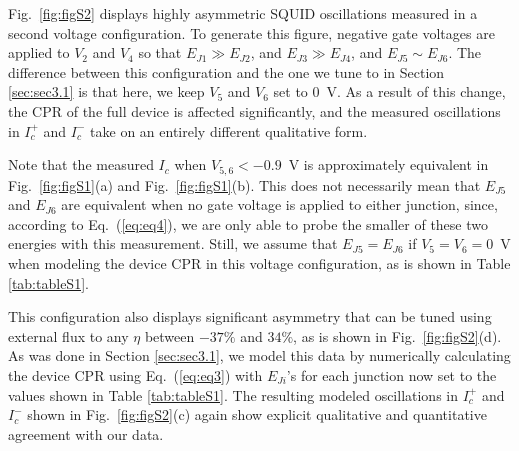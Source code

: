 \documentclass[%
 reprint,
 amsmath,amssymb,
 aps,
]{revtex4-2}
\begin{document}
Fig.~\ref{fig:figS2} displays highly asymmetric SQUID oscillations measured in a second voltage configuration. To generate this figure, negative gate voltages are applied to $V_2$ and $V_4$ so that $E_{J1} \gg E_{J2}$, and $E_{J3} \gg E_{J4}$, and $E_{J5} \sim E_{J6}$. The difference between this configuration and the one we tune to in Section \ref{sec:sec3.1} is that here, we keep $V_5$ and $V_6$ set to $0$~V. As a result of this change, the CPR of the full device is affected significantly, and the measured oscillations in $I_c^+$ and $I_c^-$ take on an entirely different qualitative form.

Note that the measured $I_c$ when $V_{5,6}<-0.9$~V is approximately equivalent in Fig.~\ref{fig:figS1}(a) and Fig.~\ref{fig:figS1}(b). This does not necessarily mean that $E_{J5}$ and $E_{J6}$ are equivalent when no gate voltage is applied to either junction, since, according to Eq.~(\ref{eq:eq4}), we are only able to probe the smaller of these two energies with this measurement. Still, we assume that $E_{J5}=E_{J6}$ if $V_5=V_6=0$~V when modeling the device CPR in this voltage configuration, as is shown in Table \ref{tab:tableS1}.

This configuration also displays significant asymmetry that can be tuned using external flux to any $\eta$ between $-37\%$ and $34\%$, as is shown in Fig.~\ref{fig:figS2}(d). As was done in Section \ref{sec:sec3.1}, we model this data by numerically calculating the device CPR using Eq.~(\ref{eq:eq3}) with $E_{Ji}$'s for each junction now set to the values shown in Table \ref{tab:tableS1}. The resulting modeled oscillations in $I_c^+$ and $I_c^-$ shown in Fig.~\ref{fig:figS2}(c) again show explicit qualitative and quantitative agreement with our data.  

\nocite{*}

\end{document}
